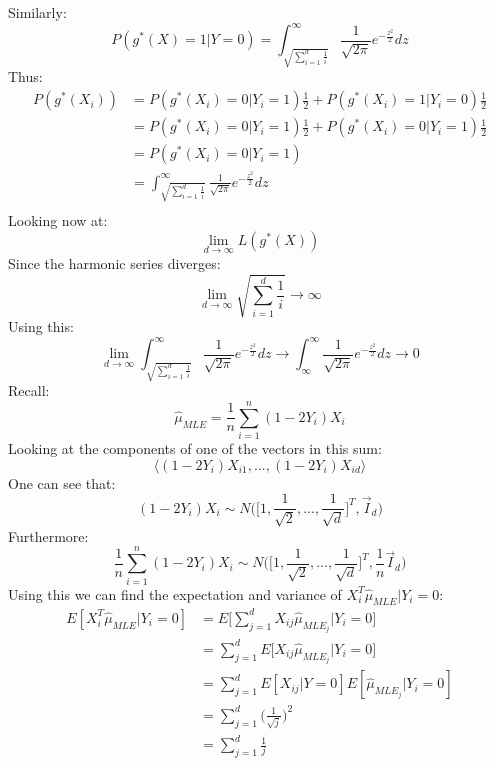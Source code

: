 \documentclass{article}
\begin{document}
  Similarly:
  $$P(g^*(X)=1|Y=0) = \int_{\sqrt{\sum_{i=1}^d \frac{1}{i}}}^{\infty} \frac{1}{\sqrt{2\pi}}e^{-\frac{z^2}{2}}dz$$
  Thus:
  \begin{align*}
    P(g^*(X_i)) &= P(g^*(X_i)=0 | Y_i=1) \frac{1}{2} + P(g^*(X_i)=1|Y_i=0) \frac{1}{2}\\
    &= P(g^*(X_i)=0 | Y_i=1) \frac{1}{2} + P(g^*(X_i)=0|Y_i=1) \frac{1}{2}\\
    &= P(g^*(X_i)=0 | Y_i=1)\\
    &= \int_{\sqrt{\sum_{i=1}^d \frac{1}{i}}}^{\infty} \frac{1}{\sqrt{2\pi}}e^{-\frac{z^2}{2}}dz\\
  \end{align*}
  Looking now at:
  $$\lim_{d \rightarrow \infty} L(g^*(X))$$
  Since the harmonic series diverges:
  $$\lim_{d \rightarrow \infty} \sqrt{\sum_{i=1}^d \frac{1}{i}} \rightarrow \infty$$
  Using this:
  $$\lim_{d \rightarrow \infty} \int_{\sqrt{\sum_{i=1}^d \frac{1}{i}}}^{\infty} \frac{1}{\sqrt{2\pi}}e^{-\frac{z^2}{2}}dz \rightarrow \int_{\infty}^{\infty} \frac{1}{\sqrt{2\pi}}e^{-\frac{z^2}{2}}dz \rightarrow  0$$
  Recall:
  $$\hat \mu_{MLE} = \frac{1}{n} \sum_{i=1}^n (1-2Y_i)X_i$$
  Looking at the components of one of the vectors in this sum:
  $$\langle (1-2Y_i)X_{i1}, ..., (1-2Y_i)X_{id} \rangle$$
  One can see that:
  $$(1-2Y_i)X_i  \sim N\bigg(\bigg[1, \frac{1}{\sqrt{2}}, ..., \frac{1}{\sqrt{d}}\bigg]^T, \vec I_d\bigg)$$
  Furthermore:
  $$\frac{1}{n} \sum_{i=1}^n (1-2Y_i)X_i \sim N\bigg(\bigg[1, \frac{1}{\sqrt{2}}, ..., \frac{1}{\sqrt{d}}\bigg]^T, \frac{1}{n} \vec I_d \bigg)$$
  Using this we can find the expectation and variance of $X^T_i \hat \mu_{MLE} | Y_i=0$:
  \begin{align*}
    E[X^T_i \hat \mu_{MLE} | Y_i=0] &= E\bigg[\sum_{j=1}^d X_{ij} \hat \mu_{MLE_j} | Y_i=0\bigg]\\
    &= \sum_{j=1}^d E\bigg[ X_{ij} \hat \mu_{MLE_j} | Y_i=0\bigg]\\
    &= \sum_{j=1}^d E[X_{ij} | Y=0]E[\hat \mu_{MLE_j} | Y_i=0]\\
    &= \sum_{j=1}^d \bigg(\frac{1}{\sqrt{j}}\bigg)^2\\
    &= \sum_{j=1}^d \frac{1}{j}\\
  \end{align*}
\end{document}
